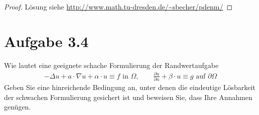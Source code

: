 \documentclass[12pt,a4paper]{article}
\begin{document}
\begin{proof}
Lösung siehe
\url{http://www.math.tu-dresden.de/~sbecher/pdenm/}
\end{proof}

\section*{Aufgabe 3.4}
Wie lautet eine geeignete schache Formulierung der Randwertaufgabe
\begin{align*}
-\Delta u+a\cdot\nabla u+\alpha\cdot u\equiv f\text{ in }\Omega,\qquad\frac{\partial u}{\partial n}+\beta\cdot u\equiv g\text{ auf } \partial\Omega
\end{align*}
Geben Sie eine hinreichende Bedingung an, unter denen die eindeutige Lösbarkeit der schwachen Formulierung gesichert ist und beweisen Sie, dass Ihre Annahmen genügen.
\end{document}
